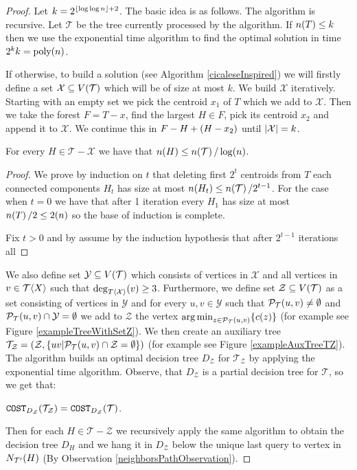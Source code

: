 \begin{theorem}
\begin{proof}
Let $k=2^{\mathopen{}\left\lfloor \log\log n \right\rfloor+2}$.
The basic idea is as follows. The algorithm is recursive. Let $\mathcal{T}$ be the tree currently processed by the algorithm. If $n\mathopen{}\left( T \right)\leq k$ then we use the exponential time algorithm to find the optimal solution in time $2^kk=\text{poly}\mathopen{}\left( n \right)$.

If otherwise, to build a solution (see Algorithm \ref{cicaleseInspired}) we will firstly define a set $\mathcal{X}\subseteq V\mathopen{}\left( \mathcal{T} \right)$ which will be of size at most $k$. We build $\mathcal{X}$ iteratively. Starting with an empty set we pick the centroid $x_1$ of $T$ which we add to $\mathcal{X}$. Then we take the forest $F=T-x$, find the largest $H\in F$, pick its centroid $x_2$ and append it to $\mathcal{X}$. We continue this in $F-H + \mathopen{}\left( H-x_2 \right)$ until $\mathopen{}\left| \mathcal{X} \right|=k$.
\begin{lemma}\label{lemma:componentSize}
    For every $H\in \mathcal{T}-\mathcal{X}$ we have that $n\mathopen{}\left( H \right)\leq n\mathopen{}\left( \mathcal{T} \right)/\log\mathopen{}\left( n \right)$.
    \begin{proof}
        We prove by induction on $t$ that deleting first $2^t$ centroids from $T$ each connected components $H_t$ has size at most $n\mathopen{}\left( H_t \right)\leq n\mathopen{}\left( \mathcal{T} \right)/2^{t-1}$. For the case when $t=0$ we have that after 1 iteration every $H_1$ has size at most $n\mathopen{}\left( T \right)/2\leq 2\mathopen{}\left( n \right)$ so the base of induction is complete.

        Fix $t>0$ and by assume by the induction hypothesis that after $2^{t-1}$ iterations all
    \end{proof}
\end{lemma}

We also define set $\mathcal{Y}\subseteq V\mathopen{}\left( \mathcal{T} \right)$ which consists of vertices in $\mathcal{X}$ and all vertices in $v\in \mathcal{T}\mathopen{}\langle X \rangle$ such that $\deg_{T\mathopen{}\langle \mathcal{X} \rangle}\mathopen{}\left( v \right)\geq 3$.
Furthermore, we define set $\mathcal{Z}\subseteq V\mathopen{}\left( \mathcal{T} \right)$ as a set consisting of vertices in $\mathcal{Y}$ and for every $u,v\in \mathcal{Y}$ such that $\mathcal{P}_{\mathcal{T}}\mathopen{}\left( u, v \right)\neq\emptyset$ and $\mathcal{P}_{\mathcal{T}}\mathopen{}\left( u, v \right)\cap \mathcal{Y}=\emptyset$ we add to $\mathcal{Z}$ the vertex $\operatorname*{arg\,min}_{z\in \mathcal{P}_{\mathcal{T}}\mathopen{}\left( u, v \right)}\mathopen{}\left\{ c\mathopen{}\left( z \right) \right\}$ (for example see Figure \ref{exampleTreeWithSetZ}). We then create an auxiliary tree $\mathcal{T}_{\mathcal{Z}}=\mathopen{}\left( \mathcal{Z},\mathopen{}\left\{ uv|\mathcal{P}_{\mathcal{T}}\mathopen{}\left( u, v \right)\cap \mathcal{Z}=\emptyset \right\} \right)$ (for example see Figure \ref{exampleAuxTreeTZ}). The algorithm builds an optimal decision tree $D_{\mathcal{Z}}$ for $\mathcal{T}_{\mathcal{Z}}$ by applying the exponential time algorithm. Observe, that  $D_{\mathcal{Z}}$ is a  partial decision tree for $\mathcal{T}$, so we get that:
\begin{observation}\label{observation:CostDZinT}
    $\texttt{COST}_{D_{\mathcal{Z}}}\mathopen{}\left( \mathcal{T}_{\mathcal{Z}} \right)=\texttt{COST}_{D_{\mathcal{Z}}}\mathopen{}\left( \mathcal{T} \right)$.
\end{observation}
Then for each $H\in \mathcal{T}-\mathcal{Z}$ we recursively apply the same algorithm to obtain the decision tree $D_H$ and we hang it in $D_\mathcal{Z}$ below the unique last query to vertex in $N_{\mathcal{T}'}\mathopen{}\left( H \right)$ (By Observation \ref{neighborsPathObservation}).



\end{proof}
\end{theorem}
